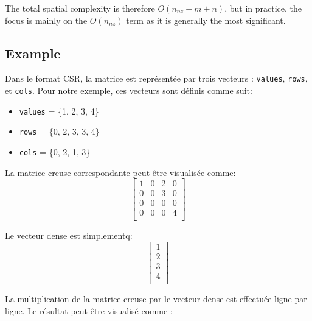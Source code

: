 \documentclass[12pt,oneside]{book} %
\begin{document}
The total spatial complexity is therefore \( O(n_{nz} + m + n) \), but in
practice, the focus is mainly on the \( O(n_{nz}) \) term as it is generally
the most significant.

\subsection{Example}

Dans le format CSR, la matrice est représentée par trois vecteurs :
\texttt{values}, \texttt{rows}, et \texttt{cols}. Pour notre exemple, ces
vecteurs sont définis comme suit:
\begin{itemize}
    \item \texttt{values} = \{1, 2, 3, 4\}
    \item \texttt{rows} = \{0, 2, 3, 3, 4\}
    \item \texttt{cols} = \{0, 2, 1, 3\}
\end{itemize}

La matrice creuse correspondante peut être visualisée comme:
\[
    \begin{bmatrix}
        1 & 0 & 2 & 0 \\
        0 & 0 & 3 & 0 \\
        0 & 0 & 0 & 0 \\
        0 & 0 & 0 & 4 \\
    \end{bmatrix}
\]

Le vecteur dense est simplementq:
\[
    \begin{bmatrix}
        1 \\
        2 \\
        3 \\
        4 \\
    \end{bmatrix}
\]

La multiplication de la matrice creuse par le vecteur dense est effectuée ligne
par ligne. Le résultat peut être visualisé comme :
\end{document}
